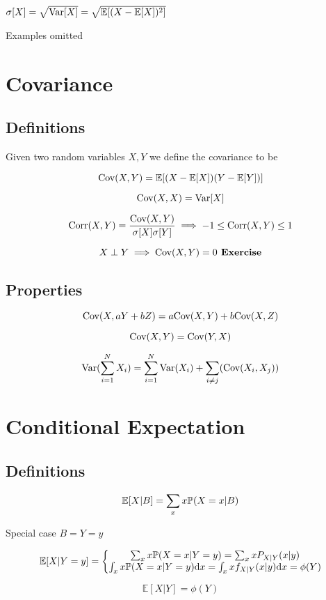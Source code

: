 $
\sigma[X]=\sqrt{\text{Var}[X]}=\sqrt{\mathbb{E}[(X-\mathbb{E}[X])^2]}
$


Examples omitted

\section{Covariance}

\subsection{Definitions}

Given two random variables $X,Y$ we define the covariance to be

$$
\text{Cov}(X,Y)=\mathbb{E}[ (X-\mathbb{E}[X])(Y-\mathbb{E}[Y]) ]
$$

$$
\text{Cov}(X,X)=\text{Var}[X]
$$

$$
\text{Corr}(X,Y)=\frac{\text{Cov}(X,Y)}{\sigma[X]\sigma[Y]}
\implies
-1\leq\text{Corr}(X,Y)\leq 1
$$

$$
X\perp Y\implies \text{Cov}(X,Y)=0\textbf{ Exercise}
$$

\subsection{Properties}

$$
\text{Cov}(X,aY+bZ)=a\text{Cov}(X,Y)+b\text{Cov}(X,Z)
$$

$$
\text{Cov}(X,Y)=\text{Cov}(Y,X)
$$

$$
\text{Var}(\sum_{i=1}^N X_i)=\sum_{i=1}^N\text{Var}(X_i)+\sum_{i\neq j}(\text{Cov}(X_i,X_j))
$$

\section{Conditional Expectation}

\subsection{Definitions}

$$
\mathbb{E}[X|B]=\sum_x x\mathbb{P}(X=x|B)
$$

Special case $B={Y=y}$

$$
\mathbb{E}[X|Y=y]=
\bigg\{
\begin{matrix}
\sum_x x\mathbb{P}(X=x|Y=y)=\sum_x x P_{X|Y}(x|y)
\\
\int_x x\mathbb{P}(X=x|Y=y)\text{d}x=\int_x x f_{X|Y}(x|y)\text{d}x
=\phi(Y)
\end{matrix}
$$

$$
\mathbb{E}[X|Y]=\phi(Y)
$$

